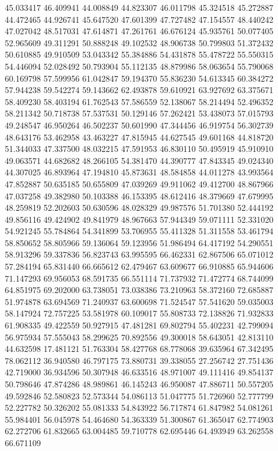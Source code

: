 45.033417
46.409941
44.008849
44.823307
46.011798
45.324518
45.272887
44.472465
44.926741
45.647520
47.601399
47.727482
47.154557
48.440242
47.027042
48.517031
47.614871
47.261761
46.676124
45.935761
50.077405
52.965609
49.311291
50.888248
49.102532
48.906738
50.799803
51.372432
50.610885
49.910509
53.043342
55.384886
54.431878
55.478722
55.550315
54.446094
52.028492
50.793904
55.112135
48.879986
58.063654
55.790068
60.169798
57.599956
61.042847
59.194370
55.836230
54.613345
60.384272
57.944238
59.542274
59.143662
62.493878
59.610921
63.927692
63.375671
58.409230
58.403194
61.762543
57.586559
52.138067
58.214494
52.496352
58.211342
50.718738
57.537531
50.129146
57.262421
53.438073
57.015793
49.248547
46.950264
46.502237
50.601990
47.344456
46.919754
56.302739
48.643176
53.462958
43.463227
47.815945
44.627545
49.601168
44.818720
51.344033
47.337500
48.032215
47.591953
46.830110
50.495919
45.910910
49.063571
44.682682
48.266105
54.381470
44.390777
47.843345
49.024340
44.307025
46.893964
47.194810
45.873631
48.584858
44.011278
43.993564
47.852887
50.635185
50.655809
47.039269
49.911062
49.412700
48.867966
47.037258
49.382980
50.103388
46.153395
48.612416
48.379669
47.679995
48.259819
52.202603
50.630596
48.028329
49.987576
51.701380
52.444192
49.856116
49.424902
49.841979
48.967663
57.944349
59.071111
52.331020
54.921245
55.784864
54.341899
53.706955
55.411328
51.311558
53.461794
58.850652
58.805966
59.136064
59.123956
51.986494
64.417192
54.290551
58.913296
59.337836
56.823743
63.995595
66.462331
62.867506
65.071012
57.284194
65.831440
66.665612
62.479467
63.609677
66.910885
65.944606
71.147293
69.956053
68.591735
66.551114
71.737932
71.472774
68.744099
64.851975
69.202000
63.738051
73.038386
73.210963
58.372160
72.685887
51.974878
63.694569
71.240937
63.600698
71.524547
57.541620
59.035003
58.147924
72.757225
53.581978
60.109017
55.808733
72.138826
71.932833
61.908335
49.422559
50.927915
47.481281
69.802794
55.402231
42.799094
56.975934
57.555043
58.299625
70.892556
49.300018
58.643051
42.813110
44.632598
17.481121
51.763304
58.427768
68.778068
39.635964
67.342495
78.062112
36.940580
46.797175
73.880731
39.338055
27.256742
27.751436
42.719000
36.934596
50.307948
46.633516
48.971007
49.111416
49.854137
50.798646
47.874286
48.989861
46.145243
46.950087
47.886711
50.557205
49.592846
52.580823
52.573344
54.086113
51.047775
51.726960
52.777799
52.227782
50.326202
55.081333
54.843922
56.717874
61.847982
54.081261
55.984401
56.045978
54.464680
54.363339
51.300867
61.365047
62.774903
62.272706
61.832665
63.004485
59.710778
62.695446
64.493949
63.262558
66.671109
